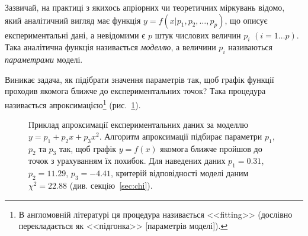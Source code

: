 \documentclass{LabBook}
\begin{document}
Зазвичай, на практиці з якихось апріорних чи теоретичних міркувань відомо, який аналітичний вигляд має функція $y = f (x| p_1, p_2, \ldots, p_p)$, що описує експериментальні дані, а невідомими є $p$ штук числових величин $p_i$ $(i = 1 \ldots p)$. Така аналітична функція називається \emph{моделлю}, а величини $p_i$ називаються \emph{параметрами} моделі.

Виникає задача, як підібрати значення параметрів так, щоб графік функції проходив якомога ближче до експериментальних точок? Така процедура називається апроксимацією\footnote{В англомовній літературі ця процедура називається <<fitting>> (дослівно перекладається як <<підгонка>> [параметрів моделі]).} (рис.~\ref{pic:some_data}).

\begin{figure}[!htbp]\centering
	\caption{Приклад апроксимації експериментальних даних за моделлю $y = p_1 + p_2x + p_3x^2$. Алгоритм апроксимації підбирає параметри $p_1$, $p_2$ та $p_3$ так, щоб графік $y = f(x)$ якомога ближче пройшов до точок з урахуванням їх похибок. Для  наведених даних $p_1 = 0.31$, $p_2 = 11.29$, $p_3 = -4.41$, критерій відповідності моделі даним $\chi^2  = 22.88$  (див. секцію~\ref{sec:chi}).}
	\label{pic:some_data}
\end{figure}
\end{document}
